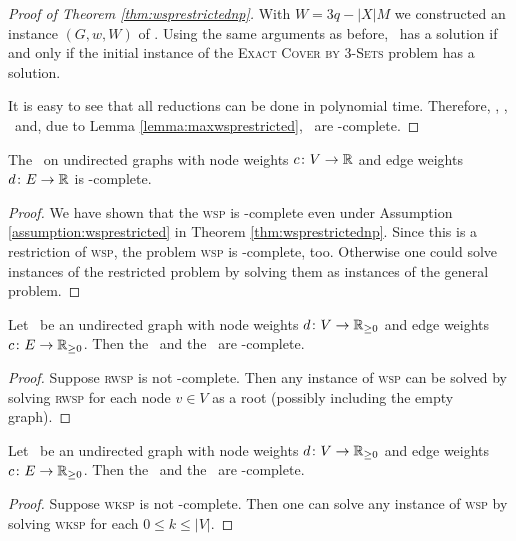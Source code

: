 \begin{proof}[Proof of Theorem \ref{thm:wsprestrictednp}]
	With $W = 3q -|X|M$ we constructed an instance $(G, w, W)$ of \minWISP. Using the same arguments as before, \minWISP\ has a solution if and only if the initial instance of the \textsc{Exact Cover by $3$-Sets} problem has a solution.
	
	It is easy to see that all reductions can be done in polynomial time. Therefore, \minWISP, \maxWISP, \minWSP\, and, due to Lemma \ref{lemma:maxwsprestricted}, \maxWSP\ are \NP-complete.
\end{proof}

\begin{corollary}
	\label{corollary:wspnp}
	The \WSP\ on undirected graphs with node weights $c\colon V \to \mathbb{R}$ and edge weights $d\colon E \to \mathbb{R}$ is \NP-complete.
\end{corollary}
\begin{proof}
	We have shown that the \textsc{wsp} is \NP-complete even under Assumption \ref{assumption:wsprestricted} in Theorem \ref{thm:wsprestrictednp}. Since this is a restriction of \textsc{wsp}, the problem \textsc{wsp} is \NP-complete, too. Otherwise one could solve instances of the restricted problem by solving them as instances of the general problem.
\end{proof}

\begin{corollary}
	\label{corollary:rwspnp}
	Let \ugraph\ be an undirected graph with node weights $d\colon V \to \mathbb{R}_{\geq 0}$ and edge weights $c\colon E \to \mathbb{R}_{\geq 0}$. Then the \RWSP\ and the \RWISP\ are \NP-complete.
\end{corollary}
\begin{proof}
	Suppose \textsc{rwsp} is not \NP-complete. Then any instance of \textsc{wsp} can be solved by solving \textsc{rwsp} for each node $v \in V$ as a root (possibly including the empty graph).
\end{proof}

\begin{corollary}
	\label{corollary:wkspnp}
	Let \ugraph\ be an undirected graph with node weights $d\colon V \to \mathbb{R}_{\geq 0}$ and edge weights $c\colon E \to \mathbb{R}_{\geq 0}$. Then the \WkSP\ and the \WIkSP\ are \NP-complete.
\end{corollary}
\begin{proof}
	Suppose \textsc{wksp} is not \NP-complete. Then one can solve any instance of \textsc{wsp} by solving \textsc{wksp} for each $0 \leq k \leq |V|$.
\end{proof}